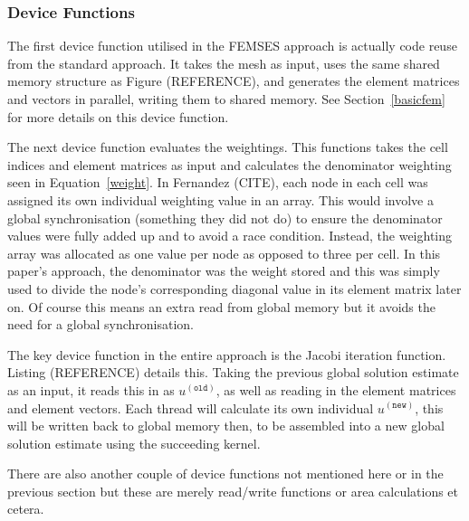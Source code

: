 \subsubsection{Device Functions}

The first device function utilised in the FEMSES approach is actually code reuse from the standard approach. It takes the mesh as input, uses the same shared memory structure as Figure (REFERENCE), and generates the element matrices and vectors in parallel, writing them to shared memory. See Section~\ref{basicfem} for more details on this device function.

The next device function evaluates the weightings. This functions takes the cell indices and element matrices as input and calculates the denominator weighting seen in Equation~\eqref{weight}. In Fernandez (CITE), each node in each cell was assigned its own individual weighting value in an array. This would involve a global synchronisation (something they did not do) to ensure the denominator values were fully added up and to avoid a race condition. Instead, the weighting array was allocated as one value per node as opposed to three per cell. In this paper's approach, the denominator was the weight stored and this was simply used to divide the node's corresponding diagonal value in its element matrix later on. Of course this means an extra read from global memory but it avoids the need for a global synchronisation.

The key device function in the entire approach is the Jacobi iteration function. Listing (REFERENCE) details this. Taking the previous global solution estimate as an input, it reads this in as $u^{(\texttt{old})}$, as well as reading in the element matrices and element vectors. Each thread will calculate its own individual $u^{(\texttt{new})}$, this will be written back to global memory then, to be assembled into a new global solution estimate using the succeeding kernel.

There are also another couple of device functions not mentioned here or in the previous section but these are merely read/write functions or area calculations et cetera.